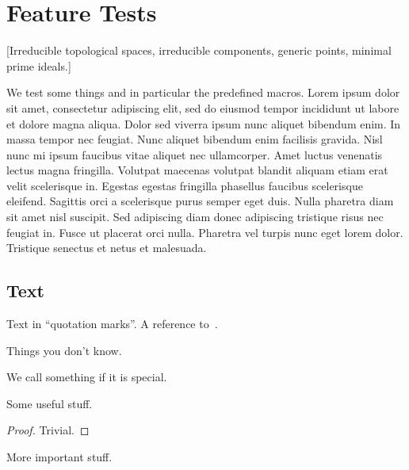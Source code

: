 \chapter{Feature Tests}

[Irreducible topological spaces, irreducible components, generic points, minimal prime ideals.]

We test some things and in particular the predefined macros.
Lorem ipsum dolor sit amet, consectetur adipiscing elit, sed do eiusmod tempor incididunt ut labore et dolore magna aliqua. Dolor sed viverra ipsum nunc aliquet bibendum enim. In massa tempor nec feugiat. Nunc aliquet bibendum enim facilisis gravida. Nisl nunc mi ipsum faucibus vitae aliquet nec ullamcorper. Amet luctus venenatis lectus magna fringilla. Volutpat maecenas volutpat blandit aliquam etiam erat velit scelerisque in. Egestas egestas fringilla phasellus faucibus scelerisque eleifend. Sagittis orci a scelerisque purus semper eget duis. Nulla pharetra diam sit amet nisl suscipit. Sed adipiscing diam donec adipiscing tristique risus nec feugiat in. Fusce ut placerat orci nulla. Pharetra vel turpis nunc eget lorem dolor. Tristique senectus et netus et malesuada.





\section{Text}

Text in \enquote{quotation marks}.
A reference to~\cite{lee}.

\begin{recall}
	Things you don’t know.
\end{recall}

\begin{definition}
	We call something  if it is special.
\end{definition}

\begin{lemma}%
	\label{generic lemma}
	Some useful stuff.
\end{lemma}

\begin{proof}
	Trivial.
\end{proof}

\begin{proposition}%
	\label{generic proposition}
	More important stuff.
\end{proposition}

